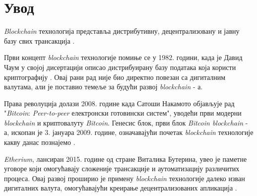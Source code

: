 \documentclass[12pt, a4paper]{article}
\begin{document}




\renewcommand{\contentsname}{Садржај} %
\tableofcontents %
\clearpage %
\setcounter{page}{3}
\pagestyle{fancy}
\fancyhf{} %
\fancyfoot[R]{\thepage} %
\renewcommand{\headrule}{} %

\section{Увод}
\textit{Blockchain} технологија представља дистрибутивну, децентрализовану и јавну базу свих трансакција \cite{1}.


Први концепт \textit{blockchain} технологије помиње се у 1982. години, када је Давид Чаум у својој дисертацији описао дистрибуирану базу података која користи криптографију \cite{2}. Овај рани рад није био директно повезан са дигиталним валутама, али је поставио темеље за будући развој \textit{blockchain} - а.

Права револуција долази 2008. године када Сатоши Накамото објављује рад "\textit{Bitcoin}: \textit{Peer-to-peer} електронски готовински систем", уводећи први модерни \textit{blockchain} и криптовалуту \textit{Bitcoin}. Генесис блок, први блок \textit{Bitcoin blockchain} - а, ископан је 3. јануара 2009. године, означавајући почетак \textit{blockchain} технологије какву данас познајемо \cite{3}.

\textit{Etherium}, лансиран 2015. године од стране Виталика Бутерина, увео је паметне уговоре који омогућавају сложеније трансакције и аутоматизацију различитих процеса. Овај развој проширио је примену \textit{blockchain} технологије далеко изван дигиталних валута, омогућавајући креирање децентрализованих апликација \cite{4}.
\end{document}

